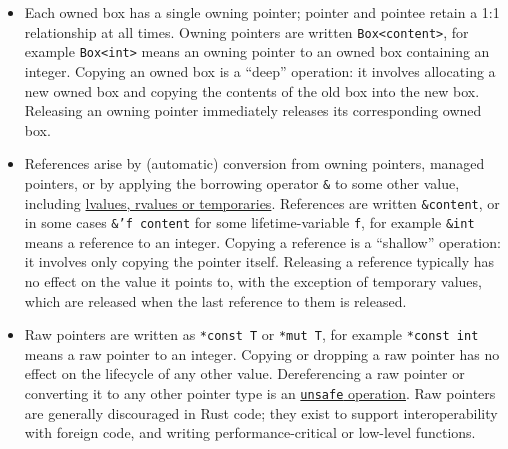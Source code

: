 \documentclass[]{article}
\begin{document}
\begin{itemize}
\item

  Each owned box has a single owning pointer; pointer and pointee retain
  a 1:1 relationship at all times. Owning pointers are written
  \texttt{Box\textless{}content\textgreater{}}, for example
  \texttt{Box\textless{}int\textgreater{}} means an owning pointer to an
  owned box containing an integer. Copying an owned box is a ``deep''
  operation: it involves allocating a new owned box and copying the
  contents of the old box into the new box. Releasing an owning pointer
  immediately releases its corresponding owned box.
\item

  References arise by (automatic) conversion from owning pointers,
  managed pointers, or by applying the borrowing operator \texttt{\&} to
  some other value, including
  \hyperref[lvalues-rvalues-and-temporaries]{lvalues, rvalues or
  temporaries}. References are written \texttt{\&content}, or in some
  cases \texttt{\&'f content} for some lifetime-variable \texttt{f}, for
  example \texttt{\&int} means a reference to an integer. Copying a
  reference is a ``shallow'' operation: it involves only copying the
  pointer itself. Releasing a reference typically has no effect on the
  value it points to, with the exception of temporary values, which are
  released when the last reference to them is released.
\item

  Raw pointers are written as \texttt{*const T} or \texttt{*mut T}, for
  example \texttt{*const int} means a raw pointer to an integer. Copying
  or dropping a raw pointer has no effect on the lifecycle of any other
  value. Dereferencing a raw pointer or converting it to any other
  pointer type is an \hyperref[unsafe-functions]{\texttt{unsafe}
  operation}. Raw pointers are generally discouraged in Rust code; they
  exist to support interoperability with foreign code, and writing
  performance-critical or low-level functions.
\end{itemize}
\end{document}
